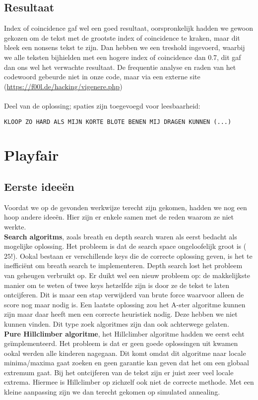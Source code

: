 \documentclass{article}
\begin{document}
\subsection{Resultaat}
Index of coincidence gaf wel een goed resultaat, oorspronkelijk hadden we gewoon gekozen om de tekst met de grootste index of coincidence te kraken, maar dit bleek een nonsens tekst te zijn. Dan hebben we een treshold ingevoerd, waarbij we alle teksten bijhielden met een hogere index of coincidence dan 0.7, dit gaf dan ons wel het verwachte resultaat. De frequentie analyse en raden van het codewoord gebeurde niet in onze code, maar via een externe site (\url{https://f00l.de/hacking/vigenere.php}) \\\\
Deel van de oplossing; spaties zijn toegevoegd voor leesbaarheid: 
\begin{verbatim}
KLOOP ZO HARD ALS MIJN KORTE BLOTE BENEN MIJ DRAGEN KUNNEN (...)
\end{verbatim}

\section{Playfair}
\subsection{Eerste idee\"en}
Voordat we op de gevonden werkwijze terecht zijn gekomen, hadden we nog een hoop andere idee\"en. Hier zijn er enkele samen met de reden waarom ze niet werkte.\\
\textbf{Search algoritms}, zoals breath en depth search waren als eerst bedacht als mogelijke oplossing. Het probleem is dat de search space ongeloofelijk groot is ($25!$). Ookal bestaan er verschillende keys die de correcte oplossing geven, is het te ineffici\"ent om breath search te implementeren. Depth search lost het probleem van geheugen verbruikt op. Er duikt wel een nieuw probleem op: de makkelijkste manier om te weten of twee keys hetzelfde zijn is door ze de tekst te laten ontcijferen. Dit is maar een stap verwijderd van brute force waarvoor alleen de score nog maar nodig is. Een laatste oplossing zou het A-ster algoritme kunnen zijn maar daar heeft men een correcte heuristiek nodig. Deze hebben we niet kunnen vinden. Dit type zoek algoritmes zijn dan ook achterwege gelaten.\\
\textbf{Pure Hillclimber algoritme}, het Hillclimber algoritme hadden we eerst echt ge\"implementeerd. Het probleem is dat er geen goede oplossingen uit kwamen ookal werden alle kinderen nagegaan. Dit komt omdat dit algoritme naar locale minima/maxima gaat zoeken en geen garantie kan geven dat het om een globaal extremum gaat. Bij het ontcijferen van de tekst zijn er juist zeer veel locale extrema. Hiermee is Hillclimber op zichzelf ook niet de correcte methode. Met een kleine aanpassing zijn we dan terecht gekomen op simulated annealing. 
\end{document}
